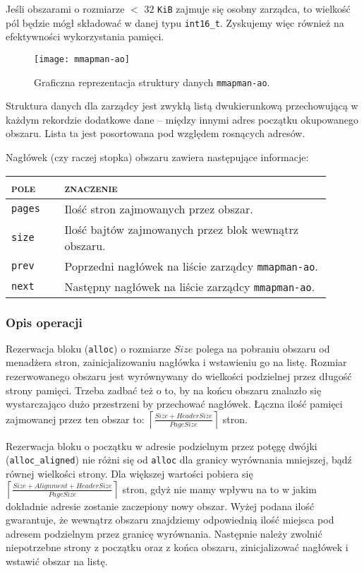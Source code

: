 \documentclass[12pt,a4paper,titlepage,twoside]{mwart}
\begin{document}
Jeśli obszarami o rozmiarze $<$ $32$ \verb+KiB+ zajmuje się osobny zarządca, to
wielkość pól będzie mógł składować w danej typu \verb+int16_t+. Zyskujemy więc
również na efektywności wykorzystania pamięci.

\begin{figure}[h]
\centering
\texttt{[image: mmapman-ao]}
\caption{Graficzna reprezentacja struktury danych \texttt{mmapman-ao}.}
\end{figure}

Struktura danych dla zarządcy jest zwykłą listą dwukierunkową przechowującą w
każdym rekordzie dodatkowe dane -- między innymi adres początku okupowanego
obszaru. Lista ta jest posortowana pod względem rosnących adresów.

Nagłówek (czy raczej stopka) obszaru zawiera następujące informacje:
\begin{center}
\begin{tabular}{|m{0.15\linewidth}|p{0.75\linewidth}|}
\hline
\textsc{pole} & \textsc{znaczenie} \\
\hline
\hline
\verb+pages+ & Ilość stron zajmowanych przez obszar. \\
\hline
\verb+size+	 & Ilość bajtów zajmowanych przez blok wewnątrz obszaru. \\
\hline
\verb+prev+	 & Poprzedni nagłówek na liście zarządcy \texttt{mmapman-ao}. \\
\hline
\verb+next+	 & Następny nagłówek na liście zarządcy \texttt{mmapman-ao}. \\
\hline
\end{tabular}
\end{center}

\subsubsection{Opis operacji}

Rezerwacja bloku (\verb+alloc+) o rozmiarze $Size$ polega na pobraniu obszaru od
menadżera stron, zainicjalizowaniu nagłówka i wstawieniu go na listę. Rozmiar
rezerwowanego obszaru jest wyrównywany do wielkości podzielnej przez długość
strony pamięci. Trzeba zadbać też o to, by na końcu obszaru znalazło się
wystarczająco dużo przestrzeni by przechować nagłówek. Łączna ilość pamięci
zajmowanej przez ten obszar to:
$\left\lceil\frac{Size + HeaderSize}{PageSize}\right\rceil$ stron.

Rezerwacja bloku o początku w adresie podzielnym przez potęgę dwójki
(\verb+alloc_aligned+) nie różni się od \verb+alloc+ dla granicy wyrównania
mniejszej, bądź równej wielkości strony. Dla większej wartości pobiera się 
$\left\lceil\frac{Size + Alignment + HeaderSize}{PageSize}\right\rceil$
stron, gdyż nie mamy wpływu na to w jakim dokładnie adresie zostanie zaczepiony
nowy obszar. Wyżej podana ilość gwarantuje, że wewnątrz obszaru znajdziemy
odpowiednią ilość miejsca pod adresem podzielnym przez granicę wyrównania.
Następnie należy zwolnić niepotrzebne strony z początku oraz z końca obszaru,
zinicjalizować nagłówek i wstawić obszar na listę.
\end{document}
